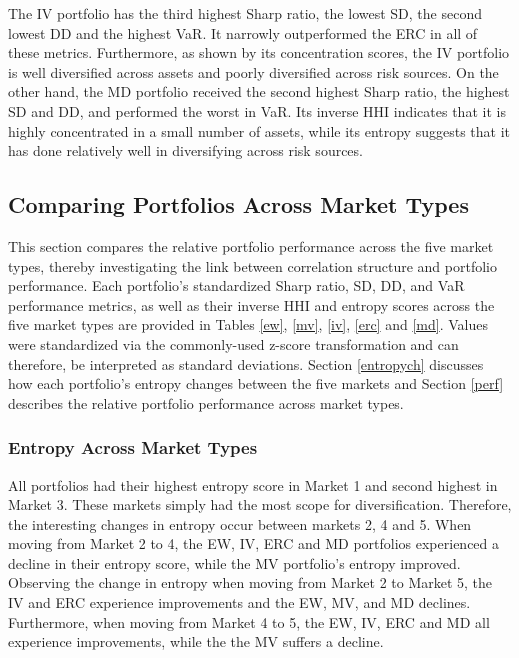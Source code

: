 \documentclass[11pt,preprint, authoryear]{elsarticle}
\numberwithin{equation}{section}
\numberwithin{figure}{section}
\numberwithin{table}{section}
\begin{document}
The IV portfolio has the third highest Sharp ratio, the lowest SD, the
second lowest DD and the highest VaR. It narrowly outperformed the ERC
in all of these metrics. Furthermore, as shown by its concentration
scores, the IV portfolio is well diversified across assets and poorly
diversified across risk sources. On the other hand, the MD portfolio
received the second highest Sharp ratio, the highest SD and DD, and
performed the worst in VaR. Its inverse HHI indicates that it is highly
concentrated in a small number of assets, while its entropy suggests
that it has done relatively well in diversifying across risk sources.

\hypertarget{comparing-portfolios-across-market-types}{%
\subsection{\texorpdfstring{Comparing Portfolios Across Market Types
\label {cross-market}}{Comparing Portfolios Across Market Types }}\label{comparing-portfolios-across-market-types}}

This section compares the relative portfolio performance across the five
market types, thereby investigating the link between correlation
structure and portfolio performance. Each portfolio's standardized Sharp
ratio, SD, DD, and VaR performance metrics, as well as their inverse HHI
and entropy scores across the five market types are provided in Tables
\ref{ew}, \ref{mv}, \ref{iv}, \ref{erc} and \ref{md}. Values were
standardized via the commonly-used z-score transformation and can
therefore, be interpreted as standard deviations. Section
\ref{entropych} discusses how each portfolio's entropy changes between
the five markets and Section \ref{perf} describes the relative portfolio
performance across market types.

\hypertarget{entropy-across-market-types}{%
\subsubsection{\texorpdfstring{Entropy Across Market Types
\label{entropych}}{Entropy Across Market Types }}\label{entropy-across-market-types}}

All portfolios had their highest entropy score in Market 1 and second
highest in Market 3. These markets simply had the most scope for
diversification. Therefore, the interesting changes in entropy occur
between markets 2, 4 and 5. When moving from Market 2 to 4, the EW, IV,
ERC and MD portfolios experienced a decline in their entropy score,
while the MV portfolio's entropy improved. Observing the change in
entropy when moving from Market 2 to Market 5, the IV and ERC experience
improvements and the EW, MV, and MD declines. Furthermore, when moving
from Market 4 to 5, the EW, IV, ERC and MD all experience improvements,
while the the MV suffers a decline.
\end{document}
